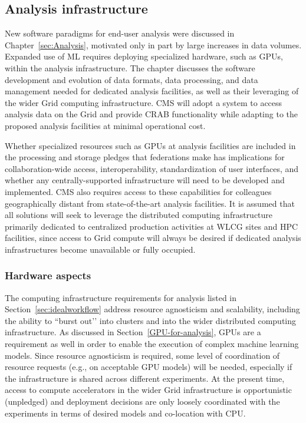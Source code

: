 
\subsection{Analysis infrastructure}
\label{sec-anal-in}

New software paradigms for end-user analysis were discussed in Chapter~\ref{sec:Analysis}, motivated only in part by large increases in data volumes. Expanded use of ML requires deploying specialized hardware, such as \glspl{GPU}, within the analysis infrastructure. The chapter discusses the software development and evolution of data formats, data processing, and data management needed for dedicated analysis facilities, as well as their leveraging of the wider Grid computing infrastructure. CMS will adopt a system to access analysis data on the Grid and provide CRAB functionality while adapting to the proposed analysis facilities at minimal operational cost. 

Whether specialized resources such as \glspl{GPU} at analysis facilities are included in the processing and storage pledges that federations make has implications for collaboration-wide access, interoperability, standardization of user interfaces, and whether any centrally-supported infrastructure will need to be developed and implemented. CMS also requires access to these capabilities for colleagues geographically distant from state-of-the-art analysis facilities. It is assumed that all solutions will seek to leverage the distributed computing infrastructure primarily dedicated to centralized production activities at \gls{WLCG} sites and \gls{HPC} facilities, since access to Grid compute will always be desired if dedicated analysis infrastructures become unavailable or fully occupied.

\subsubsection{Hardware aspects}

The computing infrastructure requirements for analysis listed in Section~\ref{sec:idealworkflow} address resource agnosticism and scalability, including the ability to ``burst out’’ into clusters and into the wider distributed computing infrastructure. As discussed in Section~\ref{GPU-for-analysis}, \glspl{GPU} are a requirement as well in order to enable the execution of complex machine learning models. Since resource agnosticism is required, some level of coordination of resource requests (e.g., on acceptable \gls{GPU} models) will be needed, especially if the infrastructure is shared across different experiments. At the present time, access to compute accelerators in the wider Grid infrastructure is opportunistic (unpledged) and deployment decisions are only loosely coordinated with the experiments in terms of desired models and co-location with \gls{CPU}.

